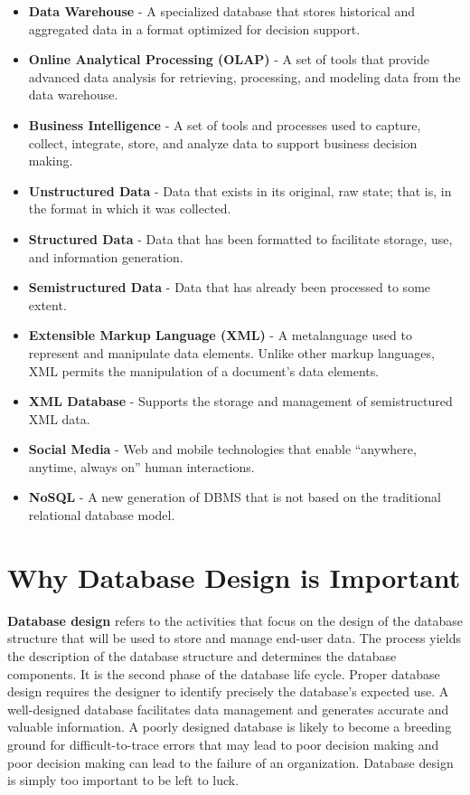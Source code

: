 \documentclass[a4paper, 12pt, titlepage]{report}
\begin{document}
\begin{itemize}
\item \textbf{Data Warehouse} - A specialized database that stores historical and aggregated data in a format optimized for decision support. 
\item \textbf{Online Analytical Processing (OLAP)} - A set of tools that provide advanced data analysis for retrieving, processing, and modeling data from the data warehouse. 
\item \textbf{Business Intelligence} - A set of tools and processes used to capture, collect, integrate, store, and analyze data to support business decision making. 
\item \textbf{Unstructured Data} - Data that exists in its original, raw state; that is, in the format in which it was collected. 
\item \textbf{Structured Data} - Data that has been formatted to facilitate storage, use, and information generation. 
\item \textbf{Semistructured Data} - Data that has already been processed to some extent.
\item \textbf{Extensible Markup Language (XML)} - A metalanguage used to represent and manipulate data elements. Unlike other markup languages, XML permits the manipulation of a document’s data elements.
\item \textbf{XML Database} - Supports the storage and management of semistructured XML data.
\item \textbf{Social Media} - Web and mobile technologies that enable “anywhere, anytime, always on” human interactions.
\item \textbf{NoSQL} - A new generation of DBMS that is not based on the traditional relational database model.
\end{itemize}
\section{Why Database Design is Important}
\textbf{Database design} refers to the activities that focus on the design of the database structure that will be used to store and manage end-user data. The process yields the description of the database structure and determines the database components. It is the second phase of the database life cycle. Proper database design requires the designer to identify precisely the database’s expected use. A well-designed database facilitates data management and generates accurate and valuable information. A poorly designed database is likely to become a breeding ground for difficult-to-trace errors that may lead to poor decision making and poor decision making can lead to the failure of an organization. Database design is simply too important to be left to luck.
\end{document}
